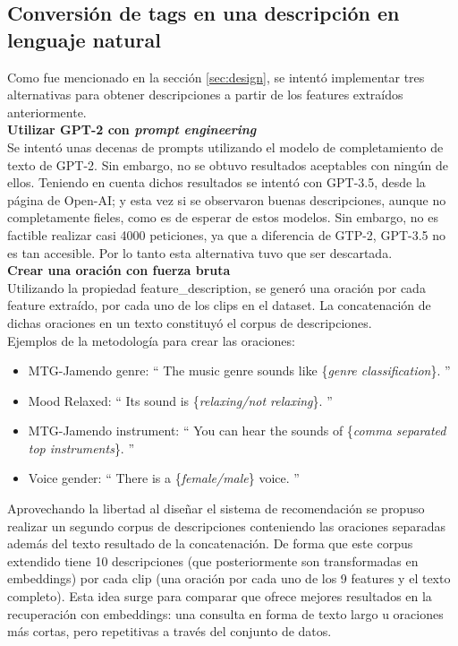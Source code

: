 \subsection{Conversión de tags en una descripción en lenguaje natural}
\label{subsec:feat-to-text}
Como fue mencionado en la sección \ref{sec:design}, se intentó implementar tres alternativas para obtener descripciones a partir de los features extraídos anteriormente. \\

\textbf{Utilizar GPT-2 con \textit{prompt engineering}}\\
Se intentó unas decenas de prompts utilizando el modelo de completamiento de texto de GPT-2. Sin embargo, no se obtuvo resultados aceptables con ningún de ellos. Teniendo en cuenta dichos resultados se intentó con GPT-3.5, desde la página de Open-AI; y esta vez si se observaron buenas descripciones, aunque no completamente fieles, como es de esperar de estos modelos. Sin embargo, no es factible realizar casi 4000 peticiones, ya que a diferencia de GTP-2, GPT-3.5 no es tan accesible. Por lo tanto esta alternativa tuvo que ser descartada.\\

\textbf{Crear una oración con fuerza bruta}\\
Utilizando la propiedad feature\_description, se generó una oración por cada feature extraído, por cada uno de los clips en el dataset. La concatenación de dichas oraciones en un texto constituyó el corpus de descripciones. \\
Ejemplos de la metodología para crear las oraciones:
\begin{itemize}
    \item MTG-Jamendo genre: `` The music genre sounds like \{\textit{genre classification}\}. ''
    \item Mood Relaxed: `` Its sound is \{\textit{relaxing/not relaxing}\}. ''
    \item MTG-Jamendo instrument: `` You can hear the sounds of \{\textit{comma separated top instruments}\}. ''
    \item Voice gender: `` There is a \{\textit{female/male}\} voice. ''
\end{itemize}

Aprovechando la libertad al diseñar el sistema de recomendación se propuso realizar un segundo corpus de descripciones conteniendo las oraciones separadas además del texto resultado de la concatenación. De forma que este corpus extendido tiene 10 descripciones (que posteriormente son transformadas en embeddings) por cada clip (una oración por cada uno de los 9 features y el texto completo). Esta idea surge para comparar que ofrece mejores resultados en la recuperación con embeddings: una consulta en forma de texto largo u oraciones más cortas, pero repetitivas a través del conjunto de datos.\\

